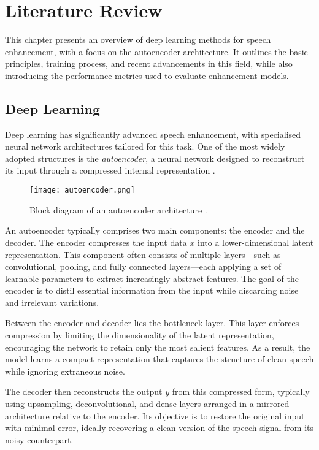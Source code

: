 \graphicspath{{content/chapters/3_literature/figures/}}
\chapter{Literature Review}
\label{sec:literature_review}

This chapter presents an overview of deep learning methods for speech enhancement, with a focus on the autoencoder architecture. It outlines the basic principles, training process, and recent advancements in this field, while also introducing the performance metrics used to evaluate enhancement models.

\section{Deep Learning}
\label{subsec:deep_learning}

Deep learning has significantly advanced speech enhancement, with specialised neural network architectures tailored for this task. One of the most widely adopted structures is the \textit{autoencoder}, a neural network designed to reconstruct its input through a compressed internal representation \cite{azarang2020review}.

\begin{figure}[h]
    \centering
    \texttt{[image: autoencoder.png]}
    \caption{\label{fig:autoencoder} Block diagram of an autoencoder architecture \cite{vachhani2017dae}.}
\end{figure}

An autoencoder typically comprises two main components: the encoder and the decoder. The encoder compresses the input data \(x\) into a lower-dimensional latent representation. This component often consists of multiple layers—such as convolutional, pooling, and fully connected layers—each applying a set of learnable parameters to extract increasingly abstract features. The goal of the encoder is to distil essential information from the input while discarding noise and irrelevant variations.

Between the encoder and decoder lies the bottleneck layer. This layer enforces compression by limiting the dimensionality of the latent representation, encouraging the network to retain only the most salient features. As a result, the model learns a compact representation that captures the structure of clean speech while ignoring extraneous noise.

The decoder then reconstructs the output \(y\) from this compressed form, typically using upsampling, deconvolutional, and dense layers arranged in a mirrored architecture relative to the encoder. Its objective is to restore the original input with minimal error, ideally recovering a clean version of the speech signal from its noisy counterpart.

